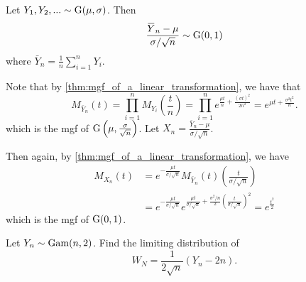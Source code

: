 \documentclass[notoc,notitlepage]{tufte-book}
\begin{document}
\begin{eg}[Example 5.7]
  Let $Y_1, Y_2, ... \sim \operatorname{G}(\mu, \sigma)$. Then
  \begin{equation*}
    \frac{\bar{Y}_n - \mu}{\sigma / \sqrt{n}} \sim \Gau(0, 1)
  \end{equation*}
  where $\bar{Y}_n = \frac{1}{n} \sum_{i=1}^{n} Y_i$.
\end{eg}

\begin{solution}
  Note that by \cref{thm:mgf_of_a_linear_transformation}, we have that
  \begin{equation*}
  M_{\bar{Y}_n}(t) = \prod_{i=1}^{n} M_{Y_i}\left(\frac{t}{n}\right) = \prod_{i=1}^{n} e^{\frac{\mu t}{n} + \frac{(\sigma t)^2}{2 n^2}} = e^{ \mu t + \frac{\sigma^2 t^2}{n} }.
  \end{equation*}
  which is the mgf of $\operatorname{G}\left(\mu, \frac{\sigma}{\sqrt{n}}\right)$. Let $X_n = \frac{\bar{Y}_n - \mu}{\sigma / \sqrt{n}}$.
  
  Then again, by \cref{thm:mgf_of_a_linear_transformation}, we have
  \begin{align*}
    M_{X_n}(t) &= e^{- \frac{\mu t}{\sigma / \sqrt{n}}} M_{\bar{Y}_n}(t) \left( \frac{t}{\sigma / \sqrt{n}} \right) \\
    &= e^{- \frac{\mu t}{\sigma / \sqrt{n}}} e^{ \frac{\mu t}{\sigma / \sqrt{n}} + \frac{\sigma^2 / n}{2} \left( \frac{t}{\sigma / \sqrt{n}} \right)^2 } = e^{\frac{t^2}{2}}
  \end{align*}
  which is the mgf of $\operatorname{G}(0, 1)$.
\end{solution}

\begin{eg}[Example 5.8]\label{eg:5_8}
  Let $Y_n \sim \operatorname{Gam}( n, 2 )$. Find the limiting distribution of
  \begin{equation*}
    W_N = \frac{1}{2 \sqrt{n}} ( Y_n - 2n ).
  \end{equation*}
\end{eg}
\end{document}
